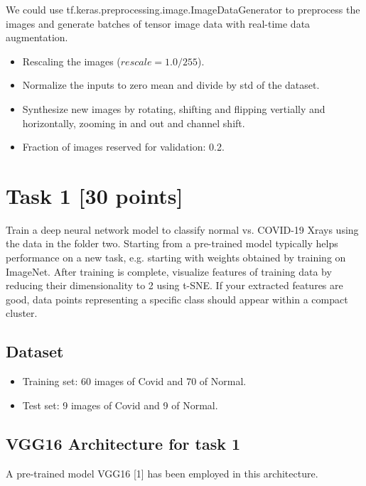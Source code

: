 \documentclass[a4paper,10pt]{article}
\begin{document}
We could use tf.keras.preprocessing.image.ImageDataGenerator 
to preprocess the images 
and generate batches of tensor image data with real-time data augmentation.

\begin{itemize}
        \item Rescaling the images ($rescale=1.0/255$).
        \item Normalize the inputs to zero mean and divide by std of the dataset.
        \item Synthesize new images by rotating, shifting and flipping vertially and horizontally, zooming in and out and channel shift.
        \item Fraction of images reserved for validation: 0.2.
\end{itemize}

\section{Task 1 [30 points]}
Train a deep neural network model to classify normal vs. COVID-19 Xrays using the data in the folder two. Starting from a pre-trained model typically helps performance on a new task, e.g. starting with weights obtained by training on ImageNet. After training is complete, visualize features of training data by reducing their dimensionality to 2 using t-SNE. If your extracted features are good, data points representing a specific class should appear within a compact cluster. 

\subsection{Dataset}
\begin{itemize}
  \item Training set: 60 images of Covid and 70 of Normal.
  \item Test set: 9 images of Covid and 9 of Normal.
\end{itemize}



\subsection{VGG16 Architecture for task 1}
A pre-trained model VGG16 [1] has been employed in this architecture. \\
\end{document}
